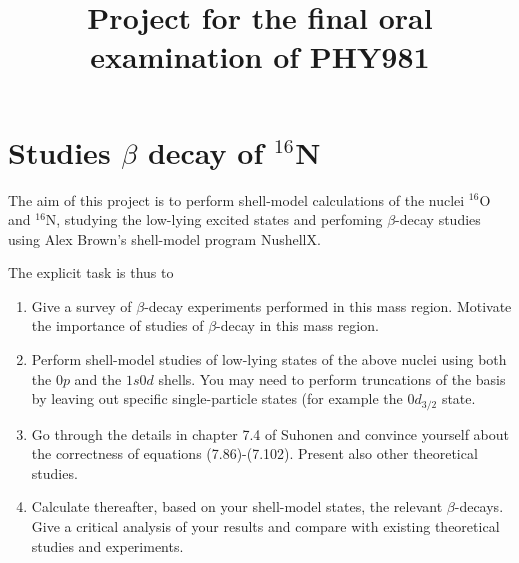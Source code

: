 \documentclass[prc]{revtex4}
\begin{document}
\title{Project for the final oral examination of PHY981 }
\maketitle
\section*{Studies $\beta$ decay of $^{16}$N}

The aim of this project is to perform shell-model calculations of the nuclei $^{16}$O and $^{16}$N, studying the low-lying excited states 
and perfoming $\beta$-decay studies using Alex Brown's shell-model program NushellX. 

The explicit task is thus to
\begin{enumerate}
\item Give a survey of $\beta$-decay experiments performed in this mass region. Motivate the importance of studies of $\beta$-decay in this mass region.
\item Perform shell-model studies of low-lying states of the above nuclei using both the $0p$ and the $1s0d$ shells. You may need to perform truncations
of the basis by leaving out specific single-particle states (for example the $0d_{3/2}$ state. 
\item Go through the details in chapter 7.4 of Suhonen and convince yourself about the correctness of equations (7.86)-(7.102). 
Present also other theoretical studies.
\item Calculate thereafter, based on your shell-model states, the relevant $\beta$-decays.
Give a critical analysis of your results and compare with existing theoretical studies and experiments.
\end{enumerate}
\end{document}
